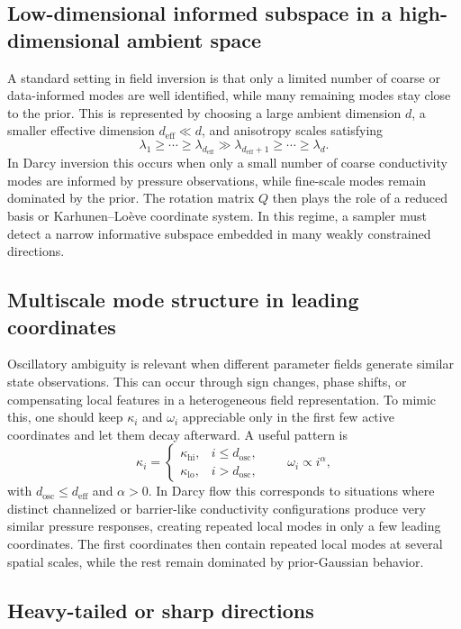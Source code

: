 \documentclass[11pt,a4paper]{article}
\begin{document}
\subsection{Low-dimensional informed subspace in a high-dimensional ambient space}

A standard setting in field inversion is that only a limited number of coarse or data-informed modes are well identified, while many remaining modes stay close to the prior. This is represented by choosing a large ambient dimension $d$, a smaller effective dimension $d_{\mathrm{eff}} \ll d$, and anisotropy scales satisfying
\[
\lambda_1 \ge \cdots \ge \lambda_{d_{\mathrm{eff}}} \gg \lambda_{d_{\mathrm{eff}}+1} \ge \cdots \ge \lambda_d.
\]
In Darcy inversion this occurs when only a small number of coarse conductivity modes are informed by pressure observations, while fine-scale modes remain dominated by the prior. The rotation matrix $Q$ then plays the role of a reduced basis or Karhunen--Lo\`eve coordinate system. In this regime, a sampler must detect a narrow informative subspace embedded in many weakly constrained directions.

\subsection{Multiscale mode structure in leading coordinates}

Oscillatory ambiguity is relevant when different parameter fields generate similar state observations. This can occur through sign changes, phase shifts, or compensating local features in a heterogeneous field representation. To mimic this, one should keep $\kappa_i$ and $\omega_i$ appreciable only in the first few active coordinates and let them decay afterward. A useful pattern is
\[
\kappa_i =
\begin{cases}
\kappa_{\mathrm{hi}}, & i \le d_{\mathrm{osc}},\\
\kappa_{\mathrm{lo}}, & i > d_{\mathrm{osc}},
\end{cases}
\qquad
\omega_i \propto i^\alpha,
\]
with $d_{\mathrm{osc}} \le d_{\mathrm{eff}}$ and $\alpha > 0$. In Darcy flow this corresponds to situations where distinct channelized or barrier-like conductivity configurations produce very similar pressure responses, creating repeated local modes in only a few leading coordinates. The first coordinates then contain repeated local modes at several spatial scales, while the rest remain dominated by prior-Gaussian behavior.

\subsection{Heavy-tailed or sharp directions}
\end{document}
